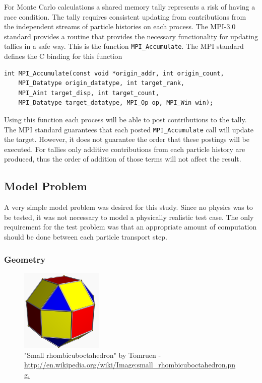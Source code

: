 \documentclass{mc2015}
\begin{document}
For Monte Carlo calculations a shared memory tally represents
a risk of having a race condition.
The tally requires consistent updating from contributions from
the independent streams of particle histories on each process.
The MPI-3.0 standard provides a routine that provides
the necessary functionality for updating tallies in a safe way.
This is the function \lstinline$MPI_Accumulate$.
The MPI standard defines the C binding for this function\cite{MPIbook}
\begin{lstlisting}
int MPI_Accumulate(const void *origin_addr, int origin_count,
    MPI_Datatype origin_datatype, int target_rank,
    MPI_Aint target_disp, int target_count,
    MPI_Datatype target_datatype, MPI_Op op, MPI_Win win);
\end{lstlisting}
Using this function each process will be able to post contributions to the tally.
The MPI standard guarantees that each posted \lstinline$MPI_Accumulate$ call
will update the target.
However, it does not guarantee the order that these postings will be executed.
For tallies only additive contributions from each particle history are produced,
thus the order of addition of those terms will not affect the result.

\subsection{Model Problem}

A very simple model problem was desired for this study.
Since no physics was to be tested, it was not necessary to model a
physically realistic test case.
The only requirement for the test problem was that an appropriate amount
of computation should be done between each particle transport step.

\subsubsection{Geometry}

\begin{figure}[h]
	\centering
		\includegraphics[width=0.35\textwidth]{Small_rhombicuboctahedron.png}
		\caption{\small "Small rhombicuboctahedron" by Tomruen -
			\url{http://en.wikipedia.org/wiki/Image:small_rhombicuboctahedron.png.}}
		\label{fig:shape}
\end{figure}
\end{document}
